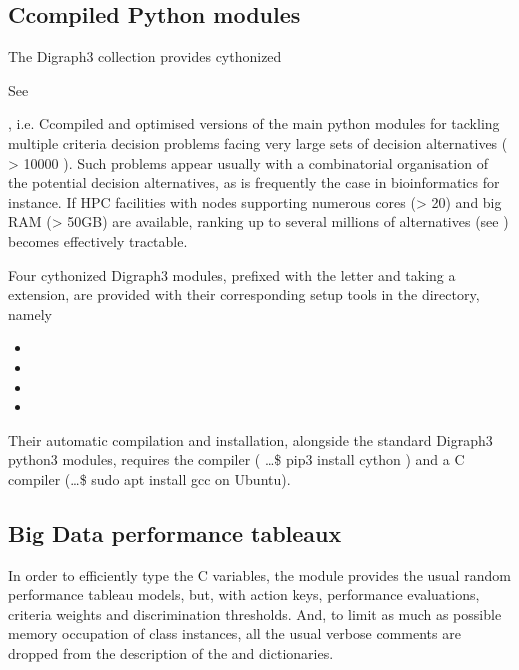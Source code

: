 \documentclass[a4paper,12pt,english]{sphinxhowto}
\begin{document}
\subsection{C\sphinxhyphen{}compiled Python modules}
\label{\detokenize{tutorial:c-compiled-python-modules}}
The Digraph3 collection provides cythonized %
\begin{footnote}[6]\sphinxAtStartFootnote
See 
%
\end{footnote}, i.e. C\sphinxhyphen{}compiled and optimised versions of the main python modules for tackling multiple criteria decision problems facing very large sets of decision alternatives ( \textgreater{} 10000 ). Such problems appear usually with a combinatorial organisation of the potential decision alternatives, as is frequently the case in bioinformatics for instance. If HPC facilities with nodes supporting numerous cores (\textgreater{} 20) and big RAM (\textgreater{} 50GB) are available, ranking up to several millions of alternatives (see ) becomes effectively tractable.

Four cythonized Digraph3 modules, prefixed with the letter  and taking a  extension, are provided with their corresponding setup tools in the  directory, namely
\begin{itemize}
\item {} 

\item {} 

\item {} 

\item {} 

\end{itemize}

Their automatic compilation and installation, alongside the standard Digraph3 python3 modules, requires the  compiler \sphinxfootnotemark[6] ( …\$ pip3 install cython ) and a C compiler (…\$ sudo apt install gcc on Ubuntu).


\subsection{Big Data performance tableaux}
\label{\detokenize{tutorial:big-data-performance-tableaux}}
In order to efficiently type the C variables, the  module provides the usual random performance tableau models, but, with  action keys,  performance evaluations,  criteria weights and  discrimination thresholds. And, to limit as much as possible memory occupation of class instances, all the usual verbose comments are dropped from the description of the  and  dictionaries.
\end{document}
